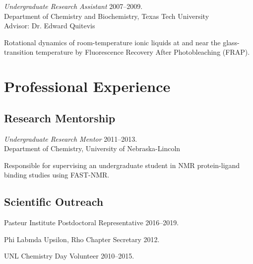 \documentclass[letterpaper]{article}
\renewenvironment{itemize}{
  \begin{list}{}{
    \setlength{\leftmargin}{1.5em}
  }
}{
  \end{list}
}
\begin{document}
\begin{itemize}
\item{
  {\it Undergraduate Research Assistant}
  \hfill 2007--2009. \\
  Department of Chemistry and Biochemistry, Texas Tech University \\
  {\setlength{\topmargin}{0pt} Advisor: Dr. Edward Quitevis}
  \begin{enumerate*}
    \item Rotational dynamics of room-temperature ionic liquids at and near
      the glass-transition temperature by Fluorescence Recovery After
      Photobleaching (FRAP).
  \end{enumerate*}
}
\end{itemize}


\section*{Professional Experience}

\subsection*{Research Mentorship}

\begin{itemize}
\item{
  {\it Undergraduate Research Mentor}
  \hfill 2011--2013. \\
  Department of Chemistry, University of Nebraska-Lincoln
  \begin{enumerate*}
    \item Responsible for supervising an undergraduate student in NMR
      protein-ligand binding studies using FAST-NMR.
  \end{enumerate*}
}
\end{itemize}

\subsection*{Scientific Outreach}

\begin{itemize}
 \item Pasteur Institute Postdoctoral Representative \hfill 2016--2019.
 \item Phi Labmda Upsilon, Rho Chapter Secretary \hfill 2012.
 \item UNL Chemistry Day Volunteer \hfill 2010--2015.
\end{itemize}
\end{document}
